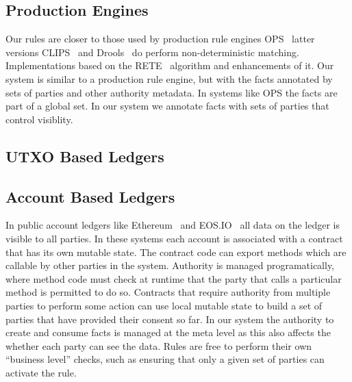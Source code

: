 

\subsection{Production Engines}
Our rules are closer to those used by production rule engines OPS~\cite{Forgy1981:OPS5} latter versions CLIPS~\cite{Riley2017:CLIPS} and Drools~\cite{Proctor2008:Drools} do perform non-deterministic matching. Implementations based on the RETE~\cite{Forgy1981:RETE} algorithm and enhancements \cite{Doorenbos1995:ProductionMatching} of it. Our system is similar to a production rule engine, but with the facts annotated by sets of parties and other authority metadata. In systems like OPS the facts are part of a global set. In our system we annotate facts with sets of parties that control visiblity.


\subsection{UTXO Based Ledgers}


\subsection{Account Based Ledgers}
In public account ledgers like Ethereum~\cite{Wood2014:Ethereum} and EOS.IO~\cite{Lee2018:EOSIO} all data on the ledger is visible to all parties. In these systems each account is associated with a contract that has its own mutable state. The contract code can export methods which are callable by other parties in the system. Authority is managed programatically, where method code must check at runtime that the party that calls a particular method is permitted to do so. Contracts that require authority from multiple parties to perform some action can use local mutable state to build a set of parties that have provided their consent so far. In our system the authority to create and consume facts is managed at the meta level as this also affects the whether each party can see the data. Rules are free to perform their own ``business level'' checks, such as ensuring that only a given set of parties can activate the rule.


